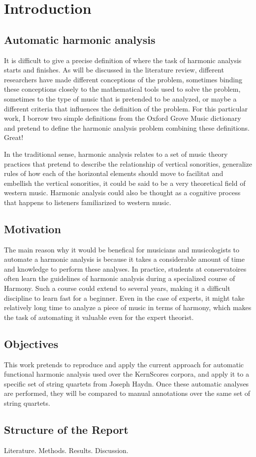 \chapter{Introduction}

\section{Automatic harmonic analysis}
It is difficult to give a precise definition of where the task of harmonic analysis starts and finishes. As will be discussed in the literature review, different researchers have made different conceptions of the problem, sometimes binding these conceptions closely to the mathematical tools used to solve the problem, sometimes to the type of music that is pretended to be analyzed, or maybe a different criteria that influences the definition of the problem. For this particular work, I borrow two simple definitions from the Oxford Grove Music dictionary and pretend to define the harmonic analysis problem combining these definitions.
\cite{oxfordanalysis} Great!


In the traditional sense, harmonic analysis relates to a set of music theory practices that pretend to describe the relationship of vertical sonorities, generalize rules of how each of the horizontal elements should move to facilitat and embellish the vertical sonorities, it could be said to be a very theoretical field of western music. Harmonic analysis could also be thought as a cognitive process that happens to listeners familiarized to western music.

\section{Motivation}
The main reason why it would be benefical for musicians and musicologists to automate a harmonic analysis is because it takes a considerable amount of time and knowledge to perform these analyses. In practice, students at conservatoires often learn the guidelines of harmonic analysis during a specialized course of Harmony. Such a course could extend to several years, making it a difficult discipline to learn fast for a beginner. Even in the case of experts, it might take relatively long time to analyze a piece of music in terms of harmony, which makes the task of automating it valuable even for the expert theorist.

\section{Objectives}
This work pretends to reproduce and apply the current approach for automatic functional harmonic analysis used over the KernScores corpora, and apply it to a specific set of string quartets from Joseph Haydn. Once these automatic analyses are performed, they will be compared to manual annotations over the same set of string quartets.

\section{Structure of the Report}
Literature. Methods. Results. Discussion.

\newpage
